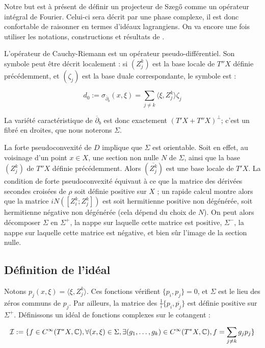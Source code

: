 Notre but est à présent de définir un projecteur de Szeg\H{o} comme un opérateur intégral de Fourier. Celui-ci sera décrit par une phase complexe, il est donc confortable de raisonner en termes d'idéaux lagrangiens. On va encore une fois utiliser les notations, constructions et résultats de \cite{hormander1985}.

L'opérateur de Cauchy-Riemann est un opérateur pseudo-différentiel. Son symbole peut être décrit localement : si $(Z^k_j)$ est la base locale de $T''X$ définie précédemment, et $(\zeta_j)$ est la base duale correspondante, le symbole est :

\begin{equation*}
	d_0 := \sigma_{\overline{\partial}_b}(x,\xi) = \sum_{j \neq k} \langle \xi, Z^k_j \rangle \zeta_j
\end{equation*}

La variété caractéristique de $\overline{\partial}_b$ est donc exactement $(T'X + T''X)^{\perp}$; c'est un fibré en droites, que nous noterons $\Sigma$. 

La forte pseudoconvexité de $D$ implique que $\Sigma$ est orientable. Soit en effet, au voisinage d'un point $x \in X$, une section non nulle $N$ de $\Sigma$, ainsi que la base $(Z^k_j)$ de $T''X$ définie précédemment. Alors $(\overline{Z^k_j})$ est une base locale de $T'X$. La condition de forte pseudoconvexité équivaut à ce que la matrice des dérivées secondes croisées de $\rho$ soit définie positive sur $X$ ; un rapide calcul montre alors que la matrice $iN([Z^k_i;Z^k_j])$ est soit hermitienne positive non dégénérée, soit hermitienne négative non dégénérée (cela dépend du choix de $N$). On peut alors décomposer $\Sigma$ en $\Sigma^+$, la nappe sur laquelle cette matrice est positive, $\Sigma^-$, la nappe sur laquelle cette matrice est négative, et bien sûr l'image de la section nulle.

\chantier 

\subsection{Définition de l'idéal}

Notons $p_j(x,\xi)= \langle \xi, Z^k_j \rangle$. Ces fonctions vérifient $\{p_i,p_j\}=0$, et $\Sigma$ est le lieu des zéros communs de $p_j$. Par ailleurs, la matrice des $\frac1i \{p_i,\overline{p_j}\}$ est définie positive sur $\Sigma^+$. Définissons un idéal de fonctions complexes sur le cotangent :

\begin{equation*}
	\mathcal{I} := \{f \in C^{\infty}(T^*X, \mathbb{C}), \forall (x,\xi) \in \Sigma, \exists (g_1, \ldots, g_k) \in C^{\infty}(T^*X, \mathbb{C}), f=\sum_{j \neq k}g_jp_j\}
\end{equation*}

